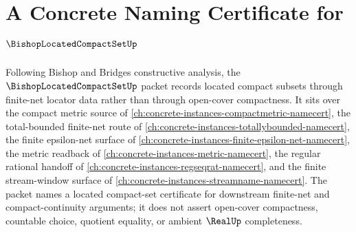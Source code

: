 \chapter{A Concrete Naming Certificate for $\BishopLocatedCompactSetUp$}
\label{ch:concrete-instances-bishop-located-compact-set-namecert}

Following Bishop and Bridges constructive analysis, the $\BishopLocatedCompactSetUp$ packet records located compact subsets through finite-net locator data rather than through open-cover compactness. It sits over the compact metric source of \autoref{ch:concrete-instances-compactmetric-namecert}, the total-bounded finite-net route of \autoref{ch:concrete-instances-totallybounded-namecert}, the finite epsilon-net surface of \autoref{ch:concrete-instances-finite-epsilon-net-namecert}, the metric readback of \autoref{ch:concrete-instances-metric-namecert}, the regular rational handoff of \autoref{ch:concrete-instances-regseqrat-namecert}, and the finite stream-window surface of \autoref{ch:concrete-instances-streamname-namecert}. The packet names a located compact-set certificate for downstream finite-net and compact-continuity arguments; it does not assert open-cover compactness, countable choice, quotient equality, or ambient $\RealUp$ completeness.

